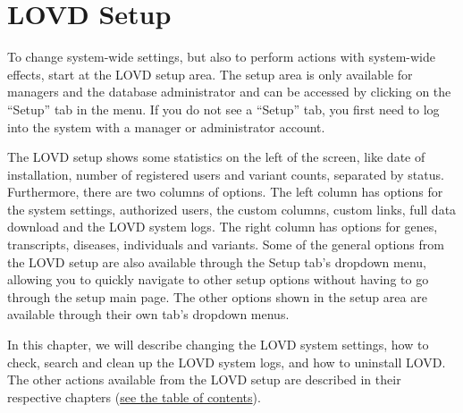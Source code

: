 \documentclass[a4paper,oneside,openany,12pt]{memoir}
\begin{document}
\hypertarget{c_setup}{}
\chapter{LOVD Setup}

To change system-wide settings, but also to perform actions with system-wide effects, start at the LOVD setup area.
The setup area is only available for managers and the database administrator and can be accessed by clicking on the ``Setup'' tab in the menu.
If you do not see a ``Setup'' tab, you first need to log into the system with a manager or administrator account.
\\
\par
The LOVD setup shows some statistics on the left of the screen, like date of installation, number of registered users and variant counts, separated by status.
Furthermore, there are two columns of options.
The left column has options for the system settings, authorized users, the custom columns, custom links, full data download and the LOVD system logs.
The right column has options for genes, transcripts, diseases, individuals and variants.
Some of the general options from the LOVD setup are also available through the Setup tab's dropdown menu,
 allowing you to quickly navigate to other setup options without having to go through the setup main page.
The other options shown in the setup area are available through their own tab's dropdown menus.
\\
\par
In this chapter, we will describe changing the LOVD system settings, how to check, search and clean up the LOVD system logs, and how to uninstall LOVD.
The other actions available from the LOVD setup are described in their respective chapters (\hyperlink{toc}{see the table of contents}).





\hypertarget{s_system_settings}{}
\end{document}
